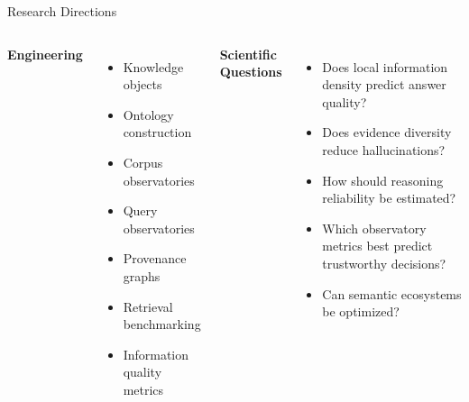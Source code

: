 \documentclass[aspectratio=169]{beamer}
\begin{document}
\begin{frame}{Research Directions}

\begin{columns}[T]


\textbf{Engineering}

\begin{itemize}
\item Knowledge objects
\item Ontology construction
\item Corpus observatories
\item Query observatories
\item Provenance graphs
\item Retrieval benchmarking
\item Information quality metrics
\end{itemize}


\textbf{Scientific Questions}

\begin{itemize}
\item Does local information density predict answer quality?
\item Does evidence diversity reduce hallucinations?
\item How should reasoning reliability be estimated?
\item Which observatory metrics best predict trustworthy decisions?
\item Can semantic ecosystems be optimized?
\end{itemize}

\end{columns}

\end{frame}

\end{document}
